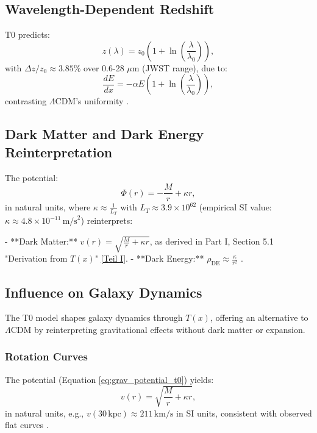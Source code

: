 \documentclass[12pt,a4paper]{article}
\newcommand{\Tfield}{T(x)}
\begin{document}
	\subsection{Wavelength-Dependent Redshift}
	\label{subsec:wavelength_redshift}
	
	T0 predicts:
	\begin{equation}
		z(\lambda) = z_0 \left(1 + \ln\left(\frac{\lambda}{\lambda_0}\right)\right),
		\label{eq:wavelength_redshift}
	\end{equation}
	with \(\Delta z / z_0 \approx 3.85\%\) over 0.6-28 \(\mu\text{m}\) (JWST range), due to:
	\begin{equation}
		\frac{dE}{dx} = -\alpha E \left(1 + \ln\left(\frac{\lambda}{\lambda_0}\right)\right),
		\label{eq:wavelength_energy_loss}
	\end{equation}
	contrasting \(\Lambda\)CDM’s uniformity \cite{pascher_params_2025}.
	
	\subsection{Dark Matter and Dark Energy Reinterpretation}
	\label{subsec:dark_reinterpretation}
The potential:
\begin{equation}
	\Phi(r) = -\frac{M}{r} + \kappa r,
	\label{eq:grav_potential_t0}
\end{equation}
in natural units, where \(\kappa \approx \frac{1}{L_T}\) with \(L_T \approx 3.9 \times 10^{62}\) (empirical SI value: \(\kappa \approx 4.8 \times 10^{-11} \, \text{m/s}^2\)) reinterprets:

	- **Dark Matter:** \(v(r) = \sqrt{\frac{M}{r} + \kappa r}\), as derived in Part I, Section 5.1 "Derivation from \(\Tfield\)" \href{https://github.com/jpascher/T0-Time-Mass-Duality/tree/main/2/pdf/English/QMRelTimeMassPart1En.pdf}{[Teil I]}.
	- **Dark Energy:** \(\rho_{\text{DE}} \approx \frac{\kappa}{r^2}\) \cite{pascher_galaxies_2025}.
	
	\subsection{Influence on Galaxy Dynamics}
	\label{subsec:galaxy_dynamics}
	
	The T0 model shapes galaxy dynamics through \(\Tfield\), offering an alternative to \(\Lambda\)CDM by reinterpreting gravitational effects without dark matter or expansion.
	
	\subsubsection{Rotation Curves}
	The potential (Equation \ref{eq:grav_potential_t0}) yields:
	\begin{equation}
		v(r) = \sqrt{\frac{M}{r} + \kappa r},
		\label{eq:rotation_velocity}
	\end{equation}
	in natural units, e.g., \(v(30 \, \text{kpc}) \approx 211 \, \text{km/s}\) in SI units, consistent with observed flat curves \cite{McGaugh2016}.
	
\end{document}
